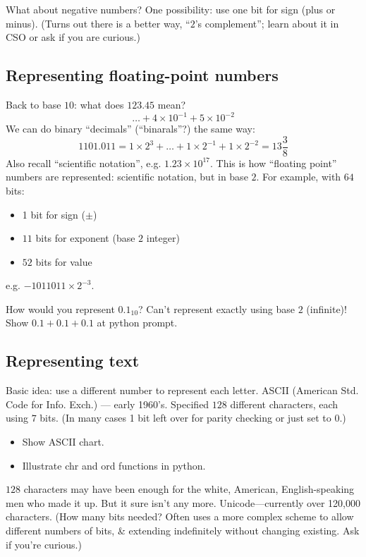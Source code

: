\documentclass{article}
\begin{document}
What about negative numbers?  One possibility: use one bit for sign
(plus or minus).  (Turns out there is a better way, ``$2$'s
complement''; learn about it in CSO or ask if you are curious.)

\subsection*{Representing floating-point numbers}

Back to base $10$: what does $123.45$ mean?
\[ \dots + 4 \times 10^{-1} + 5 \times 10^{-2} \]
We can do binary ``decimals'' (``binarals''?) the same way: \[
1101.011 = 1 \times 2^3 + \dots + 1 \times 2^{-1} + 1 \times 2^{-2} =
13 \frac{3}{8} \]  Also recall ``scientific notation'', e.g. $1.23
\times 10^{17}$.  This is how ``floating point'' numbers are
represented: scientific notation, but in base $2$.  For example, with
$64$ bits:
\begin{itemize}
\item 1 bit for sign ($\pm$)
\item $11$ bits for exponent (base $2$ integer)
\item $52$ bits for value
\end{itemize}
e.g. $-1011011 \times 2^{-3}$.

How would you represent $0.1_{10}$?  Can't represent exactly using
base $2$ (infinite)! Show $0.1 + 0.1 + 0.1$ at python prompt.

\subsection*{Representing text}

Basic idea: use a different number to represent each letter.  ASCII
(American Std. Code for Info. Exch.) --- early 1960's.  Specified
$128$ different characters, each using $7$ bits.  (In many cases 1 bit
left over for parity checking or just set to $0$.)
\begin{itemize}
\item Show ASCII chart.
\item Illustrate chr and ord functions in python.
\end{itemize}
$128$ characters may have been enough for the white, American,
English-speaking men who made it up.  But it sure isn't any more.
Unicode---currently over 120,000 characters. (How many bits needed?
Often uses a more complex scheme to allow different numbers of bits,
\& extending indefinitely without changing existing.  Ask if you're
curious.)
\end{document}
